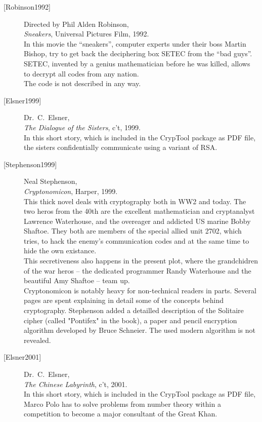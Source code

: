 \begin{description}
\item[\textrm{[Robinson1992]}] 
    Directed by Phil Alden Robinson, \\
    {\em Sneakers}, Universal Pictures Film, 1992. \\
    In this movie the ``sneakers'', computer experts under their boss Martin
    Bishop, try to get back the deciphering box SETEC from the ``bad guys''.
    SETEC, invented by a genius mathematician before he was killed, allows to
    decrypt all codes from any nation. \\
    The code is not described in any way.


\item[\textrm{[Elsner1999]}] 
    Dr.~C.~Elsner, \\
    {\em The Dialogue of the Sisters}, c't, 1999. \\
    In this short story, which is included in the CrypTool package
     as PDF file, the sisters confidentially communicate
    using a variant of RSA.


\item[\textrm{[Stephenson1999]}] 
    Neal Stephenson, \\
    {\em Cryptonomicon}, Harper, 1999. \\
    This thick novel deals with cryptography both in WW2 and today.
    The two heros from the 40th are the excellent mathematician and
    cryptanalyst Lawrence Waterhouse, and the overeager and addicted
    US marine Bobby Shaftoe. 
    They both are members of the special allied unit 2702, which tries,
    to hack the enemy's communication codes and at the same time to
    hide the own existance. \\
    This secretiveness also happens in the present plot, where the 
    grandchidren of the war heros -- the dedicated programmer  
    Randy Waterhouse and the beautiful Amy Shaftoe -- team up. \\
    Cryptonomicon is notably heavy for non-technical readers in parts.
    Several pages are spent explaining in detail some of the concepts
    behind cryptography.
    Stephenson added a detailled description of the Solitaire cipher
    (called "Pontifex" in the book), a paper and pencil encryption
    algorithm developed by Bruce Schneier.
    The used modern algorithm is not revealed.


\item[\textrm{[Elsner2001]}] 
    Dr.~C.~Elsner, \\
    {\em The Chinese Labyrinth}, c't, 2001. \\
    In this short story, which is included in the CrypTool package
     as PDF file, Marco Polo has to solve problems from
    number theory within a competition to become a major consultant of
    the Great Khan.



\end{description}
